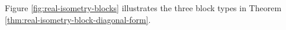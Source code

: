 Figure \ref{fig:real-isometry-blocks} illustrates the three block types in Theorem \ref{thm:real-isometry-block-diagonal-form}.

\begin{illustrationfigure}[H]
  \centering
  
  \caption{Normal form: fixed/flipped lines and rotation planes.}
  \label{fig:real-isometry-blocks}
\end{illustrationfigure}
